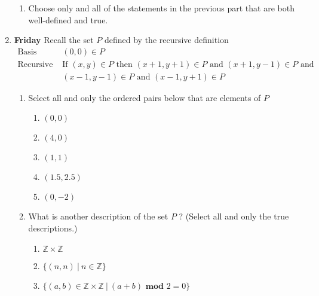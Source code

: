 \documentclass[12pt, oneside]{article}
\begin{document}
\begin{enumerate}
\begin{enumerate}
    \item Choose only and all of the statements in the previous part that are both well-defined and true.
\end{enumerate}

\item {\bf Friday} Recall the set $P$ defined by the recursive definition
\[
\begin{array}{ll}
    \textrm{Basis Step: } & (0,0) \in P\\
     \textrm{Recursive Step: } & \textrm{If } (x,y) \in P \textrm{ then } 
     (x+1, y+1) \in P \textrm{ and } (x+1, y-1) \in P \textrm{ and }\\ 
     & (x-1,y-1) \in P 
     \textrm{ and } (x-1, y+1) \in P
\end{array}
\]
\begin{enumerate}
\item Select all and only the ordered pairs below that are elements of $P$
\begin{enumerate}
\item $(0,0)$
\item $(4,0)$
\item $(1,1)$
\item $(1.5,2.5)$
\item $(0, -2)$
\end{enumerate}
\item What is another description of the set $P$ ? (Select all and only the true descriptions.)
\begin{enumerate}
\item $\mathbb{Z} \times \mathbb{Z}$
\item $\{ (n,n) ~|~ n \in \mathbb{Z} \}$
\item $\{ (a,b) \in \mathbb{Z} \times \mathbb{Z} ~|~ (a+b) \textbf{ mod } 2 =0 \}$
\end{enumerate}
\end{enumerate}


\end{enumerate}
\end{document}
